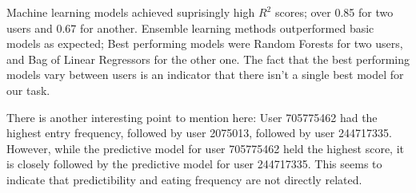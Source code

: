 Machine learning models achieved suprisingly high $R^2$ scores; over 0.85 for two users and 0.67 for another.
Ensemble learning methods outperformed basic models as expected;
Best performing models were Random Forests for two users, and Bag of Linear Regressors for the other one.
The fact that the best performing models vary between users is an indicator that there isn't a single best model for our task. 

There is another interesting point to mention here:
User 705775462 had the highest entry frequency, followed by user 2075013, followed by user 244717335.
However, while the predictive model for user  705775462 held the highest score, 
it is closely followed by the predictive model for user 244717335.
This seems to indicate that predictibility and eating frequency are not directly related.


